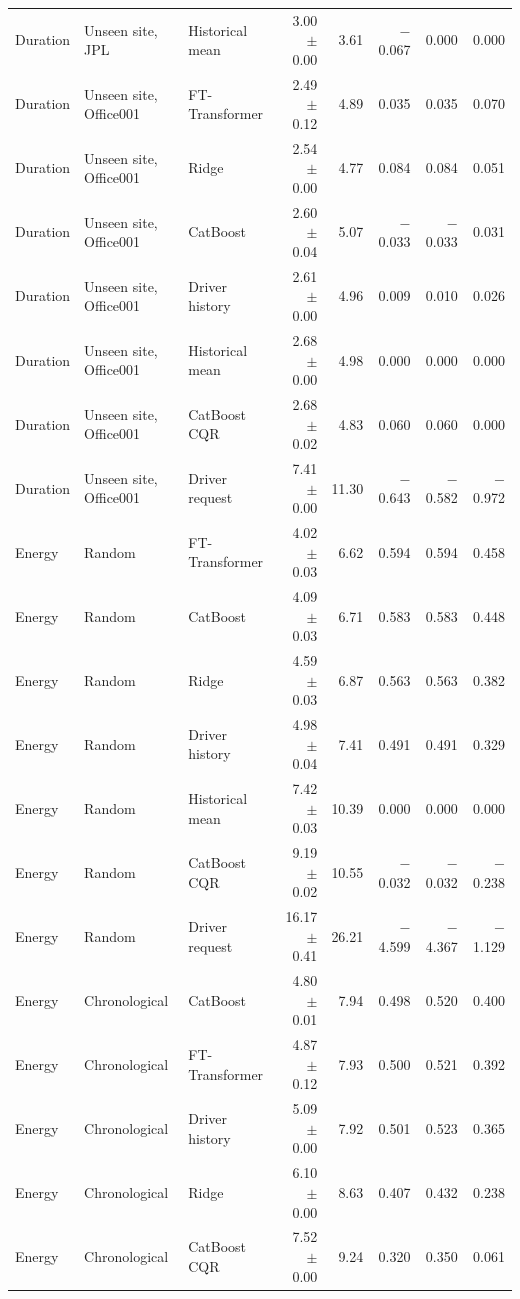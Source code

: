 {\begin{longtable}{lllrrrrr}
Duration & Unseen site, JPL & Historical mean & 3.00 $\pm$ 0.00 & 3.61 & $-$0.067 & 0.000 & 0.000 \\
Duration & Unseen site, Office001 & FT-Transformer & 2.49 $\pm$ 0.12 & 4.89 & 0.035 & 0.035 & 0.070 \\
Duration & Unseen site, Office001 & Ridge & 2.54 $\pm$ 0.00 & 4.77 & 0.084 & 0.084 & 0.051 \\
Duration & Unseen site, Office001 & CatBoost & 2.60 $\pm$ 0.04 & 5.07 & $-$0.033 & $-$0.033 & 0.031 \\
Duration & Unseen site, Office001 & Driver history & 2.61 $\pm$ 0.00 & 4.96 & 0.009 & 0.010 & 0.026 \\
Duration & Unseen site, Office001 & Historical mean & 2.68 $\pm$ 0.00 & 4.98 & 0.000 & 0.000 & 0.000 \\
Duration & Unseen site, Office001 & CatBoost CQR & 2.68 $\pm$ 0.02 & 4.83 & 0.060 & 0.060 & 0.000 \\
Duration & Unseen site, Office001 & Driver request & 7.41 $\pm$ 0.00 & 11.30 & $-$0.643 & $-$0.582 & $-$0.972 \\
Energy & Random & FT-Transformer & 4.02 $\pm$ 0.03 & 6.62 & 0.594 & 0.594 & 0.458 \\
Energy & Random & CatBoost & 4.09 $\pm$ 0.03 & 6.71 & 0.583 & 0.583 & 0.448 \\
Energy & Random & Ridge & 4.59 $\pm$ 0.03 & 6.87 & 0.563 & 0.563 & 0.382 \\
Energy & Random & Driver history & 4.98 $\pm$ 0.04 & 7.41 & 0.491 & 0.491 & 0.329 \\
Energy & Random & Historical mean & 7.42 $\pm$ 0.03 & 10.39 & 0.000 & 0.000 & 0.000 \\
Energy & Random & CatBoost CQR & 9.19 $\pm$ 0.02 & 10.55 & $-$0.032 & $-$0.032 & $-$0.238 \\
Energy & Random & Driver request & 16.17 $\pm$ 0.41 & 26.21 & $-$4.599 & $-$4.367 & $-$1.129 \\
Energy & Chronological & CatBoost & 4.80 $\pm$ 0.01 & 7.94 & 0.498 & 0.520 & 0.400 \\
Energy & Chronological & FT-Transformer & 4.87 $\pm$ 0.12 & 7.93 & 0.500 & 0.521 & 0.392 \\
Energy & Chronological & Driver history & 5.09 $\pm$ 0.00 & 7.92 & 0.501 & 0.523 & 0.365 \\
Energy & Chronological & Ridge & 6.10 $\pm$ 0.00 & 8.63 & 0.407 & 0.432 & 0.238 \\
Energy & Chronological & CatBoost CQR & 7.52 $\pm$ 0.00 & 9.24 & 0.320 & 0.350 & 0.061 \\

\end{longtable}}
